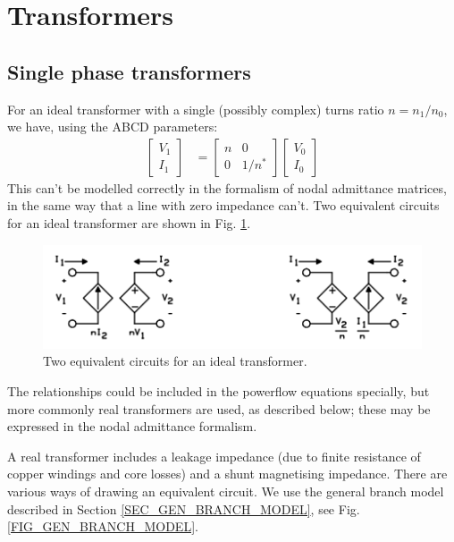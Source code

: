 \documentclass[11pt]{article}
\begin{document}
\section{Transformers}
\subsection{Single phase transformers}
For an ideal transformer with a single (possibly complex) turns ratio $n = n_1/n_0$, we have, using the ABCD parameters:
\begin{align}
\begin{bmatrix}V_1 \\ I_1\end{bmatrix} &= \begin{bmatrix}n & 0 \\ 0 & 1/n^*\end{bmatrix}\begin{bmatrix}V_0 \\ I_0 \end{bmatrix}
\end{align}
This can't be modelled correctly in the formalism of nodal admittance matrices, in the same way that a line with zero impedance can't. Two equivalent circuits for an ideal transformer are shown in Fig. \ref{FIG_IDEAL_TRANS_EQUIV}.
\begin{figure}[!h]
	\begin{center}
		\includegraphics[width=(\textwidth-2cm)]{ideal_transformer_equiv.png}
	\end{center}
	\caption{
		Two equivalent circuits for an ideal transformer.
	}
	\label{FIG_IDEAL_TRANS_EQUIV}
\end{figure}
The relationships could be included in the powerflow equations specially, but more commonly real transformers are used, as described below; these may be expressed in the nodal admittance formalism.

A real transformer includes a leakage impedance (due to finite resistance of copper windings and core losses) and a shunt magnetising impedance. There are various ways of drawing an equivalent circuit. We use the general branch model described in Section \ref{SEC_GEN_BRANCH_MODEL}, see Fig. \ref{FIG_GEN_BRANCH_MODEL}.
\end{document}
